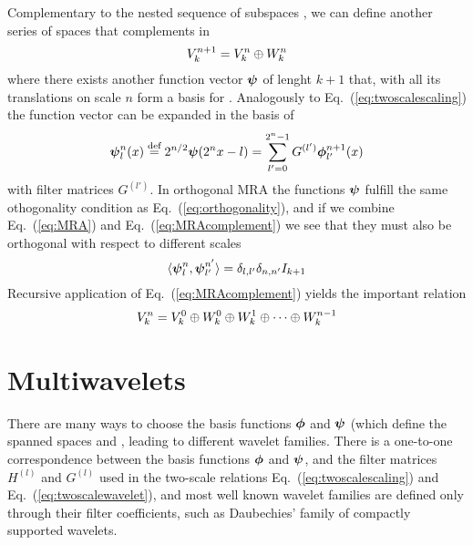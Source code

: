 Complementary to the nested sequence of subspaces , we can define 
another series of spaces  that complements  in 
\begin{equation}
    \label{eq:MRAcomplement}
    {V}_{k}^{n+1} = {V}_{k}^{n} \oplus {W}_{k}^{n}
\end{equation}
where there exists another function vector $\boldsymbol{\psi}$ of lenght $k+1$ that, with 
all its translations on scale $n$ form a basis for .
Analogously to Eq.~(\ref{eq:twoscalescaling}) the function vector can be expanded 
in the basis of 
\begin{equation}
    \label{eq:twoscalewavelet}
    \boldsymbol{\psi}^n_l(x) \stackrel{\text{def}}{\hbox{=}} 2^{n/2}\boldsymbol{\psi}(2^nx-l) = 
	\sum_{l'=0}^{2^n-1} G^{(l')}\boldsymbol{\phi}_{l'}^{n+1}(x)
\end{equation}
with filter matrices $G^{(l')}$. In orthogonal MRA the functions $\boldsymbol{\psi}$ fulfill 
the same othogonality condition as Eq.~(\ref{eq:orthogonality}), and if we combine 
Eq.~(\ref{eq:MRA}) and Eq.~(\ref{eq:MRAcomplement}) we see that they must also be 
orthogonal with respect to different scales
\begin{equation}
    \langle \boldsymbol{\psi}_l^n, \boldsymbol{\psi}_{l'}^{n'} \rangle = 
	\delta_{l,l'}\delta_{n,n'}I_{k+1}
\end{equation}
Recursive application of Eq.~(\ref{eq:MRAcomplement}) yields the important relation
\begin{equation}
    \label{eq:MRArecursive}
    {V}_{k}^{n} = {V}_{k}^{0} \oplus {W}_{k}^{0} \oplus {W}_{k}^{1}
	\oplus \cdots \oplus {W}_{k}^{n-1}
\end{equation}

\section{Multiwavelets}
There are many ways to choose the basis functions $\boldsymbol{\phi}$ and $\boldsymbol{\psi}$ 
(which define the spanned spaces  and ,
leading to different wavelet families. There is a one-to-one correspondence between 
the basis functions $\boldsymbol{\phi}$ and $\boldsymbol{\psi}$, and the filter matrices $H^{(l)}$ 
and $G^{(l)}$ used in the two-scale relations Eq.~(\ref{eq:twoscalescaling}) and 
Eq.~(\ref{eq:twoscalewavelet}), and most well known wavelet families are defined 
only through their filter coefficients, such as Daubechies' family of compactly
supported wavelets\cite{Daubechies:1988}.

